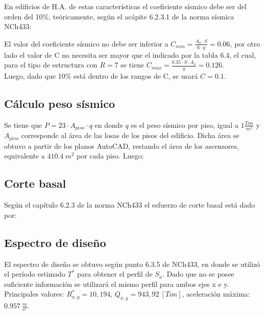 En edificios de H.A. de estas características el coeficiente sísmico debe ser del orden del 10\%, teóricamente, según el acápite 6.2.3.1 de la norma sísmica NCh433:


El valor del coeficiente sísmico no debe ser inferior a $C_{min}=\frac{A_o\cdot S}{6\cdot g} = 0.06$, por otro lado el valor de C no necesita ser mayor que el indicado por la tabla 6.4, el cual, para el tipo de estructura con $R=7$ se tiene $C_{max}=\frac{0.35\cdot S \cdot A_o}{g} = 0.126$. \\

Luego, dado que 10\% está dentro de los rangos de C, se usará $C=0.1$.

\subsection{Cálculo peso sísmico}

Se tiene que $P=23\cdot A_{piso}\cdot q$ en donde $q$ es el peso sísmico por piso, igual a $1 \frac{Ton}{m^2}$ y $A_{piso}$ corresponde al área de las losas de los pisos del edificio. Dicha área se obtuvo a partir de los planos AutoCAD, restando el área de los ascensores, equivalente a $410.4\ m^2$ por cada piso. Luego:


\subsection{Corte basal}

Según el capítulo 6.2.3 de la norma NCh433 el esfuerzo de corte basal está dado por:


\subsection{Espectro de diseño}

El espectro de diseño se obtuvo según punto 6.3.5 de NCh433, en donde se utilizó el período estimado $T^{*}$ para obtener el perfil de $S_a$. Dado que no se posee suficiente información se utilizará el mismo perfil para ambos ejes x e y. Principales valores: $R^{*}_{x,y}=10,194$, $Q_{x,y}=943,92\ [Ton]$, aceleración máxima: $0.957\ \frac{m}{s^2}$.

